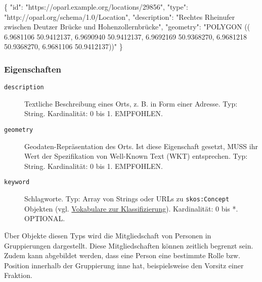 \documentclass[,a4paper]{article}
\newenvironment{Shaded}{}{}
\newcommand{\DataTypeTok}[1]{\textcolor[rgb]{0.56,0.13,0.00}{{#1}}}
\newcommand{\StringTok}[1]{\textcolor[rgb]{0.25,0.44,0.63}{{#1}}}
\newcommand{\FunctionTok}[1]{\textcolor[rgb]{0.02,0.16,0.49}{{#1}}}
\begin{document}
\begin{Shaded}
\begin{Highlighting}[]
\FunctionTok{\{}
    \DataTypeTok{"id"}\FunctionTok{:} \StringTok{"https://oparl.example.org/locations/29856"}\FunctionTok{,}
    \DataTypeTok{"type"}\FunctionTok{:} \StringTok{"http://oparl.org/schema/1.0/Location"}\FunctionTok{,}
    \DataTypeTok{"description"}\FunctionTok{:} \StringTok{"Rechtes Rheinufer zwischen Deutzer}
\StringTok{        Brücke und Hohenzollernbrücke"}\FunctionTok{,}
    \DataTypeTok{"geometry"}\FunctionTok{:} \StringTok{"POLYGON ((}
\StringTok{                6.9681106 50.9412137,}
\StringTok{                6.9690940 50.9412137,}
\StringTok{                6.9692169 50.9368270,}
\StringTok{                6.9681218 50.9368270,}
\StringTok{                6.9681106 50.9412137))"}
\FunctionTok{\}}
\end{Highlighting}
\end{Shaded}

\subsubsection{Eigenschaften}\label{eigenschaften-9}

\begin{description}
\item[\texttt{description}]
Textliche Beschreibung eines Orts, z. B. in Form einer Adresse. Typ:
String. Kardinalität: 0 bis 1. EMPFOHLEN.
\item[\texttt{geometry}]
Geodaten-Repräsentation des Orts. Ist diese Eigenschaft gesetzt, MUSS
ihr Wert der Spezifikation von Well-Known Text (WKT) entsprechen. Typ:
String. Kardinalität: 0 bis 1. EMPFOHLEN.
\item[\texttt{keyword}]
Schlagworte. Typ: Array von Strings oder URLs zu \texttt{skos:Concept}
Objekten (vgl. \hyperref[vokabulareux5fklassifizierung]{Vokabulare zur
Klassifizierung}). Kardinalität: 0 bis *. OPTIONAL.
\end{description}


Über Objekte diesen Typs wird die Mitgliedschaft von Personen in
Gruppierungen dargestellt. Diese Mitgliedschaften können zeitlich
begrenzt sein. Zudem kann abgebildet werden, dass eine Person eine
bestimmte Rolle bzw. Position innerhalb der Gruppierung inne hat,
beispielsweise den Vorsitz einer Fraktion.
\end{document}
